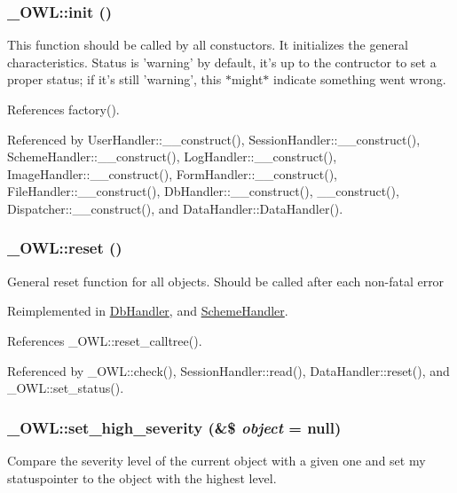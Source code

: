 \subsubsection[{init}]{\setlength{\rightskip}{0pt plus 5cm}\_\-OWL::init ()}\label{class__OWL_ae0ef3ded56e8a6b34b6461e5a721cd3e}
This function should be called by all constuctors. It initializes the general characteristics. Status is 'warning' by default, it's up to the contructor to set a proper status; if it's still 'warning', this $\ast$might$\ast$ indicate something went wrong. 

References factory().



Referenced by UserHandler::\_\-\_\-construct(), SessionHandler::\_\-\_\-construct(), SchemeHandler::\_\-\_\-construct(), LogHandler::\_\-\_\-construct(), ImageHandler::\_\-\_\-construct(), FormHandler::\_\-\_\-construct(), FileHandler::\_\-\_\-construct(), DbHandler::\_\-\_\-construct(), \_\-\_\-construct(), Dispatcher::\_\-\_\-construct(), and DataHandler::DataHandler().

\subsubsection[{reset}]{\setlength{\rightskip}{0pt plus 5cm}\_\-OWL::reset ()}\label{class__OWL_a2f2a042bcf31965194c03033df0edc9b}
General reset function for all objects. Should be called after each non-\/fatal error 

Reimplemented in \hyperlink{classDbHandler_a9982df4830f05803935bb31bac7fae3d}{DbHandler}, and \hyperlink{classSchemeHandler_aa25feb4a70d67b3d571904be4b2f50bc}{SchemeHandler}.



References \_\-OWL::reset\_\-calltree().



Referenced by \_\-OWL::check(), SessionHandler::read(), DataHandler::reset(), and \_\-OWL::set\_\-status().

\subsubsection[{set\_\-high\_\-severity}]{\setlength{\rightskip}{0pt plus 5cm}\_\-OWL::set\_\-high\_\-severity (\&\$ {\em object} = {\ttfamily null})}\label{class__OWL_a576829692a3b66e3d518853bf43abae3}
Compare the severity level of the current object with a given one and set my statuspointer to the object with the highest level. 

